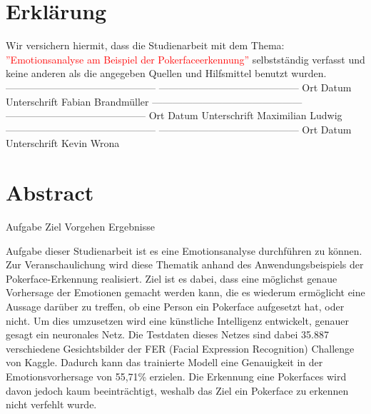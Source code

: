 \documentclass[12pt, a4paper]{report}
\begin{document}

\setlength{\parindent}{0em} 
\let\cleardoublepage\relax
{}


\section*{Erklärung}
Wir versichern hiermit, dass die Studienarbeit mit dem Thema: \textcolor{red}{''Emotionsanalyse am Beispiel der Pokerfaceerkennung''} selbstständig verfasst und keine anderen als die angegeben Quellen und Hilfsmittel benutzt wurden.
\newline
\newline
\newline
\newline
---------------------------------------------       ------------------------------------------ \newline
Ort	\hspace{2cm}		Datum\hspace{3,5 cm}				    Unterschrift Fabian Brandmüller
\newline
\newline
\newline
---------------------------------------------       ------------------------------------------ \newline
Ort	\hspace{2cm}		Datum\hspace{3,5 cm}				    Unterschrift Maximilian Ludwig
\newline
\newline
\newline
---------------------------------------------       ------------------------------------------ \newline
Ort	\hspace{2cm}		Datum\hspace{3,5 cm}				    Unterschrift Kevin Wrona
\newpage
\section*{Abstract}

Aufgabe
Ziel 
Vorgehen
Ergebnisse


Aufgabe dieser Studienarbeit ist es eine Emotionsanalyse durchführen zu können. Zur Veranschaulichung wird diese Thematik anhand des Anwendungsbeispiels der Pokerface-Erkennung realisiert.
Ziel ist es dabei, dass eine möglichst genaue Vorhersage der Emotionen gemacht werden kann, die es wiederum ermöglicht eine Aussage darüber zu treffen, ob eine Person ein Pokerface aufgesetzt hat, oder nicht.
Um dies umzusetzen wird eine künstliche Intelligenz entwickelt, genauer gesagt ein neuronales Netz. Die Testdaten dieses Netzes sind dabei 35.887  verschiedene Gesichtsbilder der FER (Facial Expression Recognition) Challenge von Kaggle. Dadurch kann das trainierte Modell eine Genauigkeit in der Emotionsvorhersage von 55,71\% erzielen. Die Erkennung eine Pokerfaces wird davon jedoch kaum beeinträchtigt, weshalb das Ziel ein Pokerface zu erkennen nicht verfehlt wurde.
\end{document}

